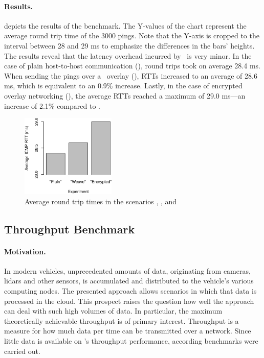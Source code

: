 \paragraph{Results.} 
 depicts the results of the benchmark. The Y-values of the chart represent the average round trip time of the 3000 pings. Note that the Y-axis is cropped to the interval between 28 and 29 ms to emphasize the differences in the bars' heights. The results reveal that the latency overhead incurred by \wnet\ is very minor. In the case of plain host-to-host communication (), round trips took on average 28.4 ms. When sending the pings over a \weave\ overlay (), RTTs increased to an average of 28.6 ms, which is equivalent to an 0.9\% increase. Lastly, in the case of encrypted overlay networking (), the average RTTs reached a maximum of 29.0 ms---an increase of 2.1\% compared to .
\begin{figure}[htpb]
  \centering
  \includegraphics[width=0.4\textwidth]{figures/ping-bar}
  \caption[\weave\ latency experiment results]{Average round trip times in the scenarios , , and }\label{fig:latency-relative}
\end{figure}

%
%
%
%
%
%
%
%
%
%
\subsection{Throughput Benchmark} \label{sec:throughput}
\paragraph{Motivation.}
In modern vehicles, unprecedented amounts of data, originating from cameras, lidars and other sensors, is accumulated and distributed to the vehicle's various computing nodes. The presented approach allows scenarios in which that data is processed in the cloud. This prospect raises the question how well the approach can deal with such high volumes of data. In particular, the maximum theoretically achievable throughput is of primary interest. Throughput is a measure for how much data per time can be transmitted over a network. Since little data is available on \wnet 's throughput performance, according benchmarks were carried out.

